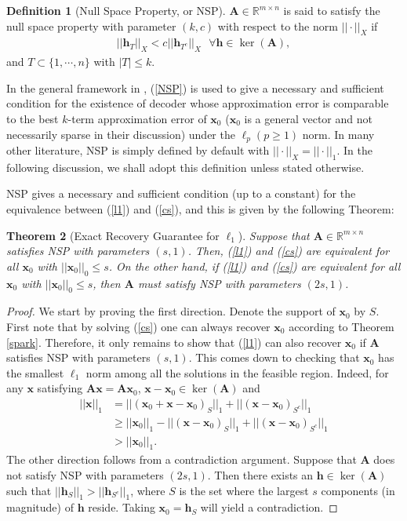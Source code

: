 \documentclass[11pt]{article}
\numberwithin{equation}{section}
\theoremstyle{plain}
\newtheorem{Th}{Theorem}[section]
\theoremstyle{definition}
\newtheorem{Def}[Th]{Definition}
\def\R{{\mathbb R}}
\def\R{{\mathbb R}}
\def\A{{\mathbf A}}
\def\x{{\mathbf x}}
\def\h{{\mathbf{h}}}
\begin{document}
\begin{Def}[Null Space Property, or NSP]
$\A\in\R^{m\times n}$ is said to satisfy the null space property with parameter $(k, c)$ with respect to the norm $|| \cdot||_X$ if 
\begin{align}
||\h_T||_X< c||\h_{T^c}||_X\ \ \ \forall \h\in\ker(\A),\label{NSP}
\end{align}
and $T\subset\{1,\cdots, n\}$ with $|T|\leq k$.  
\end{Def}
In the general framework in \cite{cohen2009compressed}, (\ref{NSP}) is used to give a necessary and sufficient condition for the existence of decoder whose approximation error is comparable to the best $k$-term approximation error of $\x_0$ ($\x_0$ is a general vector and not necessarily sparse in their discussion) under the $\ell_p (p\geq 1)$ norm. In many other literature, NSP is simply defined by default with $|| \cdot||_X=|| \cdot||_1$. In the following discussion, we shall adopt this definition unless stated otherwise.  

NSP gives a necessary and sufficient condition (up to a constant) for the equivalence between (\ref{l1}) and (\ref{cs}), and this is given by the following Theorem:

\begin{Th}[Exact Recovery Guarantee for $\ell_1$]\label{NSP-Th}
Suppose that $\A\in\R^{m\times n}$ satisfies NSP with parameters $(s, 1)$. Then, (\ref{l1}) and (\ref{cs}) are equivalent for all $\x_0$ with $||\x_0||_0\leq s$. On the other hand, if (\ref{l1}) and (\ref{cs}) are equivalent for all $\x_0$ with $||\x_0||_0\leq s$, then $\A$ must satisfy NSP with parameters $(2s,1)$.  
\end{Th} 
\begin{proof}
We start by proving the first direction. Denote the support of $\x_0$ by $S$. First note that by solving (\ref{cs}) one can always recover $\x_0$ according to Theorem \ref{spark}. Therefore, it only remains to show that (\ref{l1}) can also recover $\x_0$ if $\A$ satisfies NSP with parameters $(s,1)$. This comes down to checking that $\x_0$ has the smallest $\ell_1$ norm among all the solutions in the feasible region. Indeed, for any $\x$ satisfying $\A\x=\A\x_0$, $\x-\x_0\in\ker(\A)$ and 
\begin{align*}
||\x||_1&=||(\x_0+\x-\x_0)_S||_1+||(\x-\x_0)_{S^c}||_1\\
&\geq ||\x_0||_1-||(\x-\x_0)_S||_1+||(\x-\x_0)_{S^c}||_1\\
&>||\x_0||_1. 
\end{align*} 
The other direction follows from a contradiction argument. Suppose that $\A$ does not satisfy NSP with parameters $(2s,1)$. Then there exists an $\h\in\ker(\A)$ such that $||\h_S||_1>||\h_{S^c}||_1$, where $S$ is the set where the largest $s$ components (in magnitude) of $\h$ reside. Taking $\x_0=\h_S$ will yield a contradiction.   
\end{proof}
\end{document}
